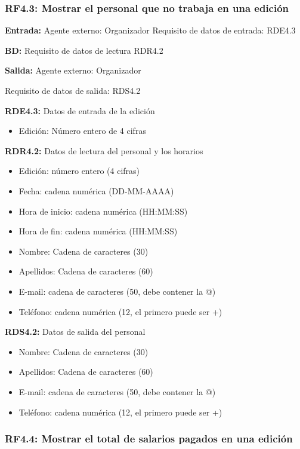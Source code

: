 \subsubsection{RF4.3: Mostrar el personal que no trabaja en una edición}

\textbf{Entrada:} Agente externo: Organizador        Requisito de datos de entrada: RDE4.3

\textbf{BD:} Requisito de datos de lectura RDR4.2

\textbf{Salida:} Agente externo: Organizador

Requisito de datos de salida: RDS4.2

\textbf{RDE4.3:} Datos de entrada de la edición
\begin{itemize}
	\item Edición: Número entero de 4 cifras
\end{itemize}

\textbf{RDR4.2:} Datos de lectura del personal y los horarios
\begin{itemize}
	\item Edición: número entero (4 cifras)
\newline
	\item Fecha: cadena numérica (DD-MM-AAAA)    
    \item Hora de inicio: cadena numérica (HH:MM:SS)
    \item Hora de fin: cadena numérica (HH:MM:SS)
\newline
	\item Nombre: Cadena de caracteres (30)
	\item Apellidos: Cadena de caracteres (60)
	\item E-mail: cadena de caracteres (50, debe contener la @)
	\item Teléfono: cadena numérica (12, el primero puede ser +)
\end{itemize}

\textbf{RDS4.2:} Datos de salida del personal
\begin{itemize}
	\item Nombre: Cadena de caracteres (30)
	\item Apellidos: Cadena de caracteres (60)
	\item E-mail: cadena de caracteres (50, debe contener la @)
	\item Teléfono: cadena numérica (12, el primero puede ser +)
\end{itemize}

\subsubsection{RF4.4: Mostrar el total de salarios pagados en una edición}

